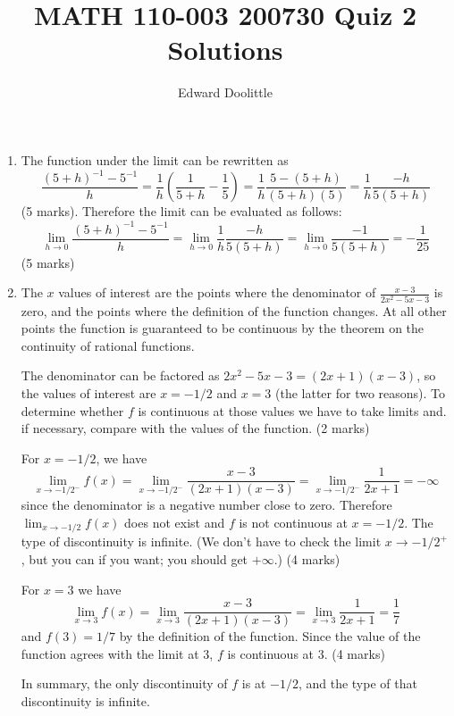 \documentclass[12pt]{article}
\title{MATH 110-003 200730 Quiz 2 Solutions}
\author{Edward Doolittle}
\newcommand{\ds}{\displaystyle}
\begin{document}
\maketitle

\begin{enumerate}
\item The function under the limit can be rewritten as
  \begin{displaymath}
    \frac{(5+h)^{-1}-5^{-1}}{h}
    = \frac{1}{h} \left(\frac{1}{5+h}-\frac{1}{5}\right)
    = \frac{1}{h} \frac{5-(5+h)}{(5+h)(5)}
    = \frac{1}{h} \frac{-h}{5(5+h)}
  \end{displaymath}
  (5 marks).  Therefore the limit can be evaluated as follows:
  \begin{displaymath}
    \lim_{h\to 0} \frac{(5+h)^{-1}-5^{-1}}{h}
    = \lim_{h\to 0} \frac{1}{h} \frac{-h}{5(5+h)} 
    = \lim_{h\to 0} \frac{-1}{5(5+h)}
    = -\frac{1}{25}
  \end{displaymath}
  (5 marks)
\item The $x$ values of interest are the points where the denominator
  of $\ds \frac{x-3}{2x^2-5x-3}$ is zero, and the points where the definition
  of the function changes.  At all other points the function is guaranteed
  to be continuous by the theorem on the continuity of rational functions.

  The denominator can be factored as $2x^2-5x-3=(2x+1)(x-3)$, so the values
  of interest are $x=-1/2$ and $x=3$ (the latter for two reasons).  To
  determine whether $f$ is continuous at those values we have to take limits
  and. if necessary, compare with the values of the function.
  (2 marks)

  For $x=-1/2$, we have
  \begin{displaymath}
    \lim_{x\to -1/2^-} f(x)
    = \lim_{x\to -1/2^-} \frac{x-3}{(2x+1)(x-3)}
    = \lim_{x\to -1/2^-} \frac{1}{2x+1}
    = -\infty
  \end{displaymath}
  since the denominator is a negative number close to zero.  Therefore
  $\ds\lim_{x\to -1/2} f(x)$ does not exist and $f$ is not continuous
  at $x=-1/2$.  The type of discontinuity is infinite.  (We don't have
  to check the limit $x\to -1/2^+$, but you can if you want; you should
  get $+\infty$.) (4 marks)

  For $x=3$ we have 
  \begin{displaymath}
    \lim_{x\to 3} f(x)
    = \lim_{x\to 3} \frac{x-3}{(2x+1)(x-3)}
    = \lim_{x\to 3} \frac{1}{2x+1}
    = \frac{1}{7}
  \end{displaymath}
  and $f(3) = 1/7$ by the definition of the function.  Since the value
  of the function agrees with the limit at $3$, $f$ is continuous at $3$.
  (4 marks)

  In summary, the only discontinuity of $f$ is at $-1/2$, and the type of
  that discontinuity is infinite.
\end{enumerate}
\end{document}
